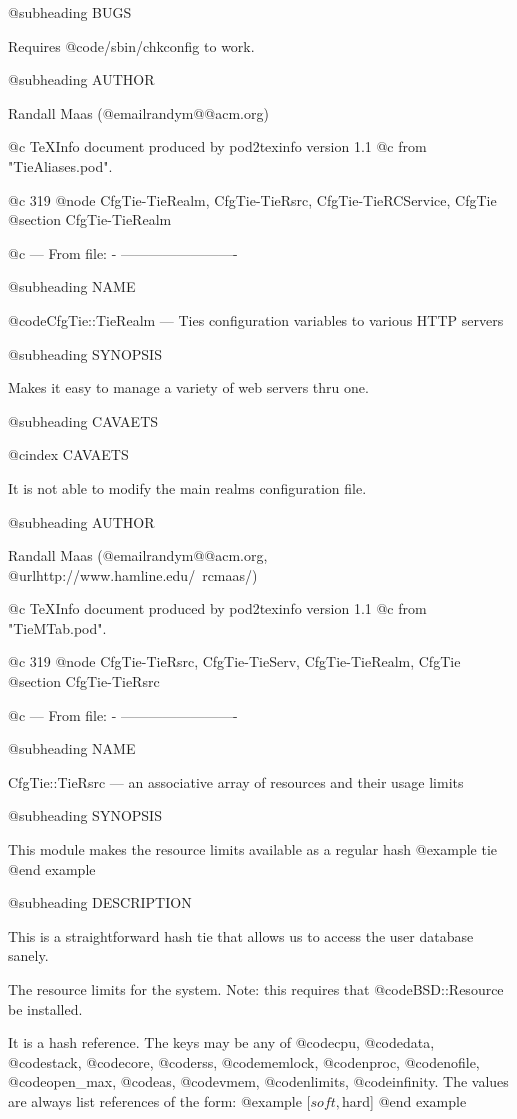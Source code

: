 {{{{{{{{{{{{{{{{{{{{@subheading BUGS

Requires @code{/sbin/chkconfig} to work.

@subheading AUTHOR

Randall Maas (@email{randym@@acm.org})

@c TeXInfo document produced by pod2texinfo version 1.1
@c from "TieAliases.pod".


@c 319
@node CfgTie-TieRealm, CfgTie-TieRsrc, CfgTie-TieRCService, CfgTie
@section CfgTie-TieRealm


@c --- From file: - -------------------------

@subheading NAME


@code{CfgTie::TieRealm} --- Ties configuration variables to various HTTP servers

@subheading SYNOPSIS

Makes it easy to manage a variety of web servers thru one.

@subheading CAVAETS

@cindex CAVAETS

It is not able to modify the main realms configuration file.

@subheading AUTHOR

Randall Maas (@email{randym@@acm.org}, @url{http://www.hamline.edu/~rcmaas/})

@c TeXInfo document produced by pod2texinfo version 1.1
@c from "TieMTab.pod".


@c 319
@node CfgTie-TieRsrc, CfgTie-TieServ, CfgTie-TieRealm, CfgTie
@section CfgTie-TieRsrc


@c --- From file: - -------------------------

@subheading NAME


CfgTie::TieRsrc --- an associative array of resources and their usage limits

@subheading SYNOPSIS

This module makes the resource limits available as a regular hash
@example
        tie %
@end example

@subheading DESCRIPTION

This is a straightforward hash tie that allows us to access the user database
sanely.

The resource limits for the system.
Note: this requires that @code{BSD::Resource} be installed.

It is a hash reference.  The keys may be any of @code{cpu}, @code{data}, @code{stack},
@code{core}, @code{rss}, @code{memlock}, @code{nproc}, @code{nofile}, @code{open_max}, @code{as}, @code{vmem},
@code{nlimits}, @code{infinity}.  The values are always list references of the form:
@example
                [$soft, $hard]
@end example

}}}}}}}}}}}}}}}}}}}}
